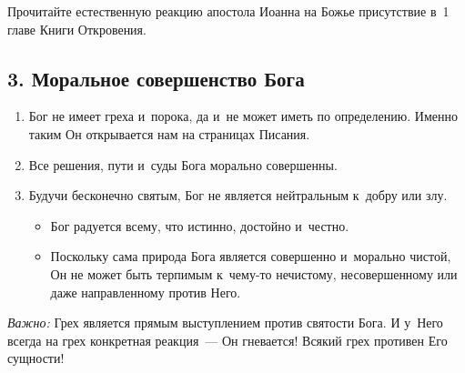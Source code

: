 \documentclass[a4paper,12pt]{article}
\begin{document}
\begin{enumerate}
    Прочитайте естественную реакцию апостола Иоанна на Божье присутствие в~1 главе Книги Откровения.
\end{enumerate}

\subsection{3. Моральное совершенство Бога}

\begin{enumerate}
    \item Бог не имеет греха и~порока, да и~не может иметь по определению. Именно таким Он открывается нам на страницах Писания.
    \item Все решения, пути и~суды Бога морально совершенны.
    \item Будучи бесконечно святым, Бог не является нейтральным к~добру или злу.
    \begin{itemize}
        \item Бог радуется всему, что истинно, достойно и~честно.
        \item Поскольку сама природа Бога является совершенно и~морально чистой, Он не может быть терпимым к~чему-то нечистому, несовершенному или даже направленному против Него. 
    \end{itemize}
\end{enumerate}

\noindent \emph{Важно:} Грех является прямым выступлением против святости Бога. И у~Него всегда на грех конкретная реакция~--- Он гневается! Всякий грех противен Его сущности!
\end{document}
